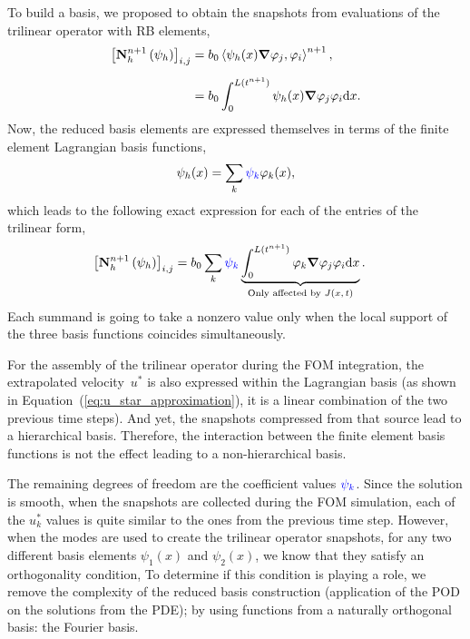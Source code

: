 \documentclass[../../thesis.tex]{subfiles}
\newcommand{\inner}[2]{\left<#1, #2\right>}
\newcommand{\Ah}[1]{\ensuremath{\vb{#1}^{n+1}_h}}
\begin{document}
To build a basis, we proposed to obtain the snapshots from evaluations 
of the trilinear operator with RB elements,
\begin{equation}
    \begin{split}
        \qty[\Ah{N}\left(\psi_{h}\right)]_{i,j}
        &= b_0 \inner{\psi_h(x)\grad \varphi_j}{\varphi_i}^{n+1},
        \\[2mm]
        &= b_0 \int_{0}^{L(t^{n+1})} \psi_h(x) \grad \varphi_j \varphi_i \dd x.
    \end{split}
\end{equation}
Now, the reduced basis elements are expressed themselves in terms of 
the finite element Lagrangian basis functions,
\begin{equation}
    \psi_h(x) = \sum_{k} 
    \textcolor{blue}{\psi_k} 
    \varphi_{k}(x),
\end{equation}
which leads to the following exact expression for each of the entries of the trilinear form,
\begin{equation}
    \begin{split}
        \qty[\Ah{N}\left(\psi_{h}\right)]_{i,j}
        &= b_0 \sum_k 
        \textcolor{blue}{\psi_k} 
        \underbrace{\int_{0}^{L(t^{n+1})} 
        \varphi_{k} \grad \varphi_j \varphi_i \dd x}_{\text{Only affected by $J(x, t)$}}.
    \end{split}
    \label{eq:appendix_exact_representation_triliear_form}
\end{equation}
Each summand is going to take a nonzero value only when the local support of the three
basis functions coincides simultaneously.

For the assembly of the trilinear operator during the FOM integration, 
the extrapolated velocity~$u^{*}$ is also expressed within the Lagrangian basis
(as shown in Equation~(\ref{eq:u_star_approximation}), 
it is a linear combination of the two previous time steps).
And yet, the snapshots compressed from that source lead to a hierarchical basis.
Therefore, the interaction between the finite element basis functions
is not the effect leading to a non-hierarchical basis.

The remaining degrees of freedom are the coefficient values 
$\textcolor{blue}{\psi_k}$.
Since the solution is smooth,
when the snapshots are collected during the FOM simulation, 
each of the $u_k^{*}$ values is quite similar to the ones from the previous time step.
However, when the modes are used to create 
the trilinear operator snapshots, 
for any two different basis elements $\psi_1(x)$ and $\psi_2(x)$,
we know that they satisfy an orthogonality condition,
To determine if this condition is playing a role, 
we remove the complexity of the reduced basis construction 
(application of the POD on the solutions from the PDE);
by using functions from a naturally orthogonal basis:
the Fourier basis.
\end{document}
